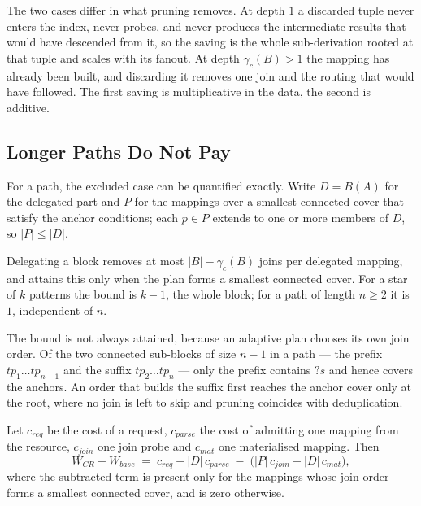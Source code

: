 The two cases differ in what pruning removes. At depth $1$ a discarded tuple never enters
the index, never probes, and never produces the intermediate results that would have
descended from it, so the saving is the whole sub-derivation rooted at that tuple and
scales with its fanout. At depth $\gamma_c(B) > 1$ the mapping has already been built,
and discarding it removes one join and the routing that would have followed. The first
saving is multiplicative in the data, the second is additive.

\subsection{Longer Paths Do Not Pay}

For a path, the excluded case can be quantified exactly. Write $D = B(A)$ for the
delegated part and $P$ for the mappings over a smallest connected cover that satisfy the
anchor conditions; each $p \in P$ extends to one or more members of $D$, so
$|P| \leq |D|$.

\begin{corollary}
Delegating a block removes at most $|B| - \gamma_c(B)$ joins per delegated mapping, and
attains this only when the plan forms a smallest connected cover. For a star of $k$
patterns the bound is $k - 1$, the whole block; for a path of length $n \geq 2$ it is $1$,
independent of $n$.
\end{corollary}

The bound is not always attained, because an adaptive plan chooses its own join order. Of
the two connected sub-blocks of size $n-1$ in a path --- the prefix $tp_1 \dots tp_{n-1}$
and the suffix $tp_2 \dots tp_n$ --- only the prefix contains $?s$ and hence covers the
anchors. An order that builds the suffix first reaches the anchor cover only at the root,
where no join is left to skip and pruning coincides with deduplication.

\begin{proposition}
Let $c_{\mathit{req}}$ be the cost of a request, $c_{\mathit{parse}}$ the cost of
admitting one mapping from the resource, $c_{\mathit{join}}$ one join probe and
$c_{\mathit{mat}}$ one materialised mapping. Then
\[
W_{CR} - W_{\mathit{base}} \;=\;
c_{\mathit{req}} + |D|\,c_{\mathit{parse}}
\;-\; \bigl( |P|\,c_{\mathit{join}} + |D|\,c_{\mathit{mat}} \bigr),
\]
where the subtracted term is present only for the mappings whose join order forms a
smallest connected cover, and is zero otherwise.
\end{proposition}

